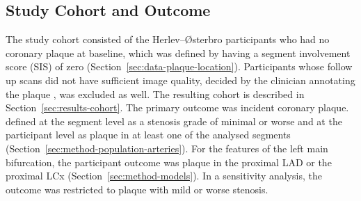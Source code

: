 \providecommand{\clarify}[1]{\textcolor{red}{\textbf{Clarification needed:} #1}}
\subsection{Study Cohort and Outcome}
\label{sec:method-population}
 The study cohort consisted of the Herlev--{\O}sterbro participants who had no coronary plaque at baseline, which was defined by having a segment involvement score (SIS) of zero (Section~\ref{sec:data-plaque-location}).
Participants whose follow up scans did not have sufficient image quality, decided by the clinician annotating the plaque , was excluded as well. The resulting cohort is described in Section~\ref{sec:results-cohort}.
The primary outcome was incident coronary plaque.  defined at the segment level as a stenosis grade of minimal or worse and at the participant level as plaque in at least one of the analysed segments (Section~\ref{sec:method-population-arteries}).
For the features of the left main bifurcation, the participant outcome was plaque in the proximal LAD or the proximal LCx (Section~\ref{sec:method-models}).
In a sensitivity analysis, the outcome was restricted to plaque with mild or worse stenosis.

